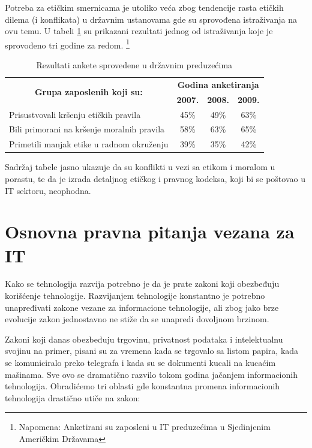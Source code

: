 \documentclass[a4paper]{article}
\begin{document}
{%
Potreba za etičkim smernicama je utoliko veća zbog tendencije rasta etičkih dilema (i konflikata) u državnim ustanovama gde su sprovođena istraživanja na ovu temu.
U tabeli \ref{tabela} su prikazani rezultati jednog od istraživanja koje je sprovođeno tri godine za redom.
\footnote{Napomena: Anketirani su zaposleni u IT preduzećima u Sjedinjenim Američkim Državama}
\vspace{0.5cm}
\begin{table}[h!]
\begin{adjustbox}{width=\textwidth}
\begin{tabular}{|l|l|c|c|c|}
\hline
\multicolumn{2}{|c|}{\multirow{2}{*}{\textbf{Grupa zaposlenih koji su:}}}         & \multicolumn{3}{c|}{\textbf{Godina anketiranja}} \\ \cline{3-5} 
\multicolumn{2}{|c|}{}  & \textbf{2007.}    & \textbf{2008.}   & \textbf{2009.}   \\ \hline
\multicolumn{2}{|l|}{\small{Prisustvovali kršenju etičkih pravila}}      & 45\%  & 49\% & 63\%  \\ \hline
\multicolumn{2}{|l|}{\small{Bili primorani na kršenje moralnih pravila}} & 58\%  & 63\% & 65\%  \\ \hline
\multicolumn{2}{|l|}{\small{Primetili manjak etike u radnom okruženju}}  & 39\%  & 35\% & 42\%  \\ \hline
\end{tabular} 
\end{adjustbox} 
\caption{Rezultati ankete sprovedene u državnim preduzećima}
\label{tabela}
\end{table} 

Sadržaj tabele jasno ukazuje da su konflikti u vezi sa etikom i moralom u porastu, te da je izrada detaljnog etičkog i pravnog kodeksa, koji bi se poštovao u IT sektoru, neophodna.

\section{Osnovna pravna pitanja vezana za IT}

Kako se tehnologija razvija potrebno je da je prate zakoni koji obez\-be\-đu\-ju korišćenje tehnologije. Razvijanjem tehnologije konstantno je potrebno unapređivati zakone vezane za informacione tehnologije, ali zbog jako brze evolucije zakon jednostavno ne stiže da se unapredi dovoljnom brzinom.

Zakoni koji danas obezbeđuju trgovinu, privatnost podataka i intelektualnu svojinu na primer, pisani su za vremena kada se trgovalo sa listom papira, kada se komuniciralo preko telegrafa i kada su se dokumenti kucali na kucaćim mašinama.\cite{Legal_issues} Sve ovo se dramatično razvilo tokom godina jačanjem informacionih tehnologija.
Obradićemo tri oblasti gde konstantna promena informacionih tehnologija drastično utiče na zakon:

}
\end{document}
